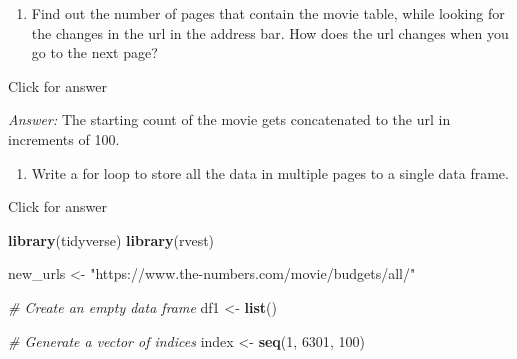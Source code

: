 \documentclass[
]{book}
\newenvironment{Shaded}{\begin{snugshade}}{\end{snugshade}}
\newcommand{\CommentTok}[1]{\textcolor[rgb]{0.56,0.35,0.01}{\textit{#1}}}
\newcommand{\DecValTok}[1]{\textcolor[rgb]{0.00,0.00,0.81}{#1}}
\newcommand{\FunctionTok}[1]{\textcolor[rgb]{0.13,0.29,0.53}{\textbf{#1}}}
\newcommand{\NormalTok}[1]{#1}
\newcommand{\OtherTok}[1]{\textcolor[rgb]{0.56,0.35,0.01}{#1}}
\newcommand{\StringTok}[1]{\textcolor[rgb]{0.31,0.60,0.02}{#1}}
\providecommand{\tightlist}{%
  \setlength{\itemsep}{0pt}\setlength{\parskip}{0pt}}
\begin{document}
\begin{enumerate}
\def\labelenumi{\arabic{enumi}.}
\setcounter{enumi}{1}
\tightlist
\item
  Find out the number of pages that contain the movie table, while looking for the changes in the url in the address bar. How does the url changes when you go to the next page?
\end{enumerate}

Click for answer

\emph{Answer:} The starting count of the movie gets concatenated to the url in increments of 100.

\begin{enumerate}
\def\labelenumi{\arabic{enumi}.}
\setcounter{enumi}{2}
\tightlist
\item
  Write a for loop to store all the data in multiple pages to a single data frame.
\end{enumerate}

Click for answer

\begin{Shaded}
\begin{Highlighting}[]
\FunctionTok{library}\NormalTok{(tidyverse)}
\FunctionTok{library}\NormalTok{(rvest)}

\NormalTok{new\_urls }\OtherTok{\textless{}{-}} \StringTok{"https://www.the{-}numbers.com/movie/budgets/all/"}

\CommentTok{\# Create an empty data frame}
\NormalTok{df1 }\OtherTok{\textless{}{-}} \FunctionTok{list}\NormalTok{()}

\CommentTok{\# Generate a vector of indices}
\NormalTok{index }\OtherTok{\textless{}{-}} \FunctionTok{seq}\NormalTok{(}\DecValTok{1}\NormalTok{, }\DecValTok{6301}\NormalTok{, }\DecValTok{100}\NormalTok{)}
\end{Highlighting}
\end{Shaded}
\end{document}
